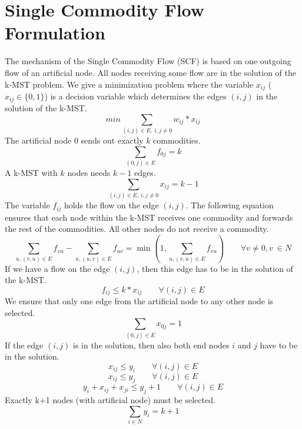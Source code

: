 \documentclass [11pt]{article}
\begin{document}
\section{Single Commodity Flow Formulation}
The mechanism of the Single Commodity Flow (SCF) is based on
one outgoing flow of an artificial node. 
All nodes receiving some flow are in the solution of the k-MST problem.
We give a minimization problem where the variable $x_{ij}$ ($x_{ij} \in \{0,1\}$)
is a decision variable which determines the edges $(i,j)$ in the solution
of the k-MST.
\begin{equation}
min \sum_{(i,j) \in E, \ i,j \not =  0} w_{ij} * x_{ij} 
\end{equation}
The artificial node $0$ sends out exactly $k$ commodities.
\begin{equation}
\sum_{(0,j) \in E} f_{0j} = k 
\end{equation}
A k-MST with $k$ nodes needs $k-1$ edges.
\begin{equation}
\sum_{(i,j) \in E, \ i,j \not =  0} x_{ij} = k-1 
\end{equation}
The variable $f_{ij}$ holds the flow on the edge $(i,j)$. 
The following equation ensures that each node within the k-MST
receives one commodity and forwards the rest of the commodities. 
All other nodes do not receive a commodity.
\begin{equation}
\sum_{u, (v,u) \in E} f_{vu} - \sum_{u, (u,v) \in E} f_{uv} = \min (1, \sum_{u, (v,u) \in E} f_{vu}) \qquad  \forall v \not = 0, v \ \in N 
\end{equation}
If we have a flow on the edge $(i,j)$, then this edge has to be
in the solution of the k-MST.
\begin{equation}
f_{ij} \leq k * x_{ij} \qquad \forall (i,j) \in E 
\end{equation}
We ensure that only one edge from the artificial node to any
other node is selected.
\begin{equation}
\sum_{(0,j) \in E} x_{0j} = 1 
\end{equation}
If the edge $(i,j)$ is in the solution, then also both end nodes $i$ and $j$ 
have to be in the solution.
\begin{equation}
  x_{ij} \leq y_{i} \qquad \forall (i,j) \in E
  \label{lbl:xy1}
\end{equation}
\begin{equation}
  x_{ij} \leq y_{j} \qquad \forall (i,j) \in E
  \label{lbl:xy2}
\end{equation}
\begin{equation}
 y_{i} + x_{ij} + x_{ji} \leq y_{j} + 1 \qquad \forall (i,j) \in E
 \label{lbl:xy3}
\end{equation}
Exactly k+1 nodes (with artificial node) must be selected.
\begin{equation}
  \sum_{i \in N} y_i = k + 1
  \label{lbl:yk}
\end{equation}
\end{document}
